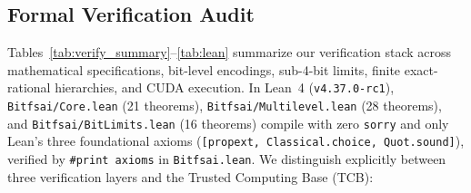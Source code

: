 \documentclass[10pt]{article}
\begin{document}
\subsection{Formal Verification Audit}\label{sec:audit}
Tables~\ref{tab:verify_summary}--\ref{tab:lean} summarize our verification stack across mathematical specifications, bit-level encodings, sub-4-bit limits, finite exact-rational hierarchies, and CUDA execution. In Lean~4 (\texttt{v4.37.0-rc1}), \texttt{Bitfsai/Core.lean} (21 theorems), \texttt{Bitfsai/Multilevel.lean} (28 theorems), and \texttt{Bitfsai/BitLimits.lean} (16 theorems) compile with zero \texttt{sorry} and only Lean's three foundational axioms (\texttt{[propext, Classical.choice, Quot.sound]}), verified by \texttt{\#print axioms} in \texttt{Bitfsai.lean}. We distinguish explicitly between three verification layers and the Trusted Computing Base (TCB):
\end{document}
